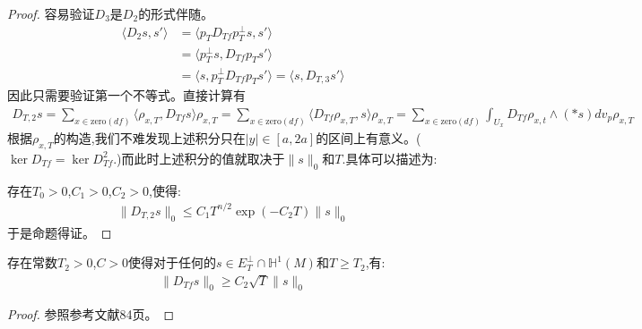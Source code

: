 \begin{proof}
	容易验证$D_3$是$D_2$的形式伴随。
	\begin{align}
		\langle D_2s,s'\rangle &=\langle p_TD_{Tf}p_T^{\perp}s,s'\rangle\\&=\langle p_T^{\perp}s,D_{Tf}p_Ts'\rangle\\&=\langle s,p_T^{\perp}D_{Tf}p_Ts'\rangle=\langle s,D_{T,3}s'\rangle
	\end{align}
	因此只需要验证第一个不等式。直接计算有
	\begin{align}
		D_{T,2}s=\sum_{x \in \mathrm{zero}(df)}\langle \rho_{x,T},D_{Tf}s\rangle\rho_{x,T}=\sum_{x \in \mathrm{zero}(df)}\langle D_{Tf}\rho_{x,T},s\rangle\rho_{x,T}=\sum_{x\in \mathrm{zero}(df)}\int_{U_x}D_{Tf}\rho_{x,t} \wedge (*s) dv_p \rho_{x,T}
	\end{align}
	根据$\rho_{x,T}$的构造,我们不难发现上述积分只在$|y|\in [a,2a]$的区间上有意义。($\ker D_{Tf}=\ker D_{Tf}^2$.)而此时上述积分的值就取决于$\|s\|_0$和$T$.具体可以描述为:

	存在$T_0>0$,$C_1>0$,$C_2>0$,使得:
	\begin{align}
		\|D_{T,2}s\|_0 \leq C_1T^{n/2}\exp(-C_2T)\|s\|_0
	\end{align}
	于是命题得证。
	\end{proof}
\begin{proposition}
	存在常数$T_2>0$,$C>0$使得对于任何的$s \in E_T^\perp \cap \mathbb{H}^1(M)$和$T\geq T_2$,有:
	\begin{align}
		\|D_{Tf}s\|_0\geq C_2\sqrt{T}\|s\|_0
	\end{align}
\end{proposition}
\begin{proof}
	参照参考文献84页。
\end{proof}

\ifx\allfiles\undefined
	
	
	
	
	\else
	\fi
